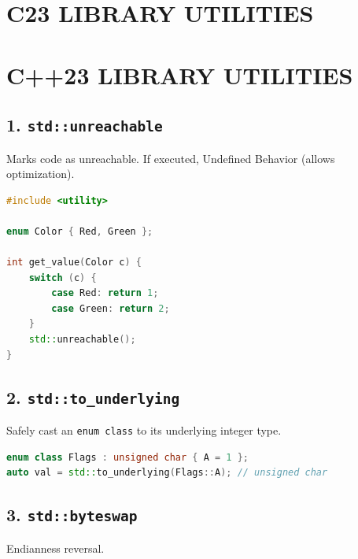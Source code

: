 \hypertarget{c23-library-utilities}{%
\chapter{C23 LIBRARY UTILITIES}\label{c23-library-utilities}}

\hypertarget{c23-library-utilities-1}{%
\chapter{C++23 LIBRARY UTILITIES}\label{c23-library-utilities-1}}

\hypertarget{stdunreachable}{%
\section{\texorpdfstring{1.
\texttt{std::unreachable}}{1. std::unreachable}}\label{stdunreachable}}

Marks code as unreachable. If executed, Undefined Behavior (allows
optimization).

\begin{lstlisting}[language={C++}]
#include <utility>

enum Color { Red, Green };

int get_value(Color c) {
    switch (c) {
        case Red: return 1;
        case Green: return 2;
    }
    std::unreachable();
}
\end{lstlisting}

\hypertarget{stdto_underlying}{%
\section{\texorpdfstring{2.
\texttt{std::to\_underlying}}{2. std::to\_underlying}}\label{stdto_underlying}}

Safely cast an \passthrough{\lstinline!enum class!} to its underlying
integer type.

\begin{lstlisting}[language={C++}]
enum class Flags : unsigned char { A = 1 };
auto val = std::to_underlying(Flags::A); // unsigned char
\end{lstlisting}

\hypertarget{stdbyteswap}{%
\section{\texorpdfstring{3.
\texttt{std::byteswap}}{3. std::byteswap}}\label{stdbyteswap}}

Endianness reversal.

